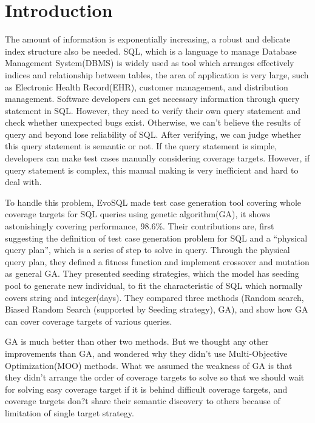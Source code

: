 \chapter{Introduction}

The amount of information is exponentially increasing, a robust and delicate index structure also be needed. SQL, which is a language to manage Database Management System(DBMS) is widely used as tool which arranges effectively indices and relationship between tables, the area of application is very large, such as Electronic Health Record(EHR), customer management, and distribution management. Software developers can get necessary information through query statement in SQL. However, they need to verify their own query statement and check whether unexpected bugs exist. Otherwise, we can't believe the results of query and beyond lose reliability of SQL. After verifying, we can judge whether this query statement is semantic or not. If the query statement is simple, developers can make test cases manually considering coverage targets. However, if query statement is complex, this manual making is very inefficient and hard to deal with.

To handle this problem, EvoSQL\cite{castelein2018search} made test case generation tool covering whole coverage targets for SQL queries using genetic algorithm(GA), it shows astonishingly covering performance, 98.6\%. Their contributions are, first suggesting the definition of test case generation problem for SQL and a ``physical query plan'', which is a series of step to solve in query. Through the physical query plan, they defined a fitness function and implement crossover and mutation as general GA. They presented seeding strategies, which the model has seeding pool to generate new individual, to fit the characteristic of SQL which normally covers string and integer(days). They compared three methods (Random search, Biased Random Search (supported by Seeding strategy), GA), and show how GA can cover coverage targets of various queries.
 

GA is much better than other two methods. But we thought any other improvements than GA, and wondered why they didn't use Multi-Objective Optimization(MOO)\cite{panichella2015reformulating} methods. What we assumed the weakness of GA is that they didn't arrange the order of coverage targets to solve so that we should wait for solving easy coverage target if it is behind difficult coverage targets, and coverage targets don?t share their semantic discovery to others because of limitation of single target strategy.
 

